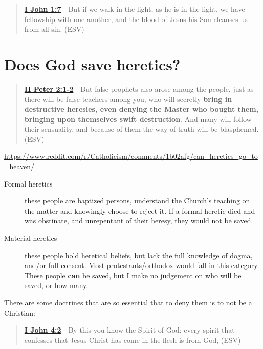 \documentclass[11pt]{article}
\begin{document}
\begin{quote}
\textbf{\href{https://www.biblegateway.com/passage/?search=1\%20John\%201\%3A7\&version=ESV}{I John 1:7}} - But if we walk in the light, as he is in the light, we have fellowship with one another, and the blood of Jesus his Son cleanses us from all sin. (ESV)
\end{quote}

\section{Does God save heretics?}
\label{sec:org36acc91}
\begin{quote}
\textbf{\href{https://www.biblegateway.com/passage/?search=2\%20Peter\%202\%3A1-2\&version=ESV}{II Peter 2:1-2}} - But false prophets also arose among the people, just as there will be false teachers among you, who will secretly \textbf{bring in destructive heresies, even denying the Master who bought them, bringing upon themselves swift destruction}. And many will follow their sensuality, and because of them the way of truth will be blasphemed. (ESV)
\end{quote}

\url{https://www.reddit.com/r/Catholicism/comments/1b02afg/can\_heretics\_go\_to\_heaven/}

\begin{description}
\item[{Formal heretics}] these people are baptized persons, understand the Church's teaching on the matter and knowingly choose to reject it. If a formal heretic died and was obstinate, and unrepentant of their heresy, they would not be saved.

\item[{Material heretics}] these people hold heretical beliefs, but lack the full knowledge of dogma, and/or full consent. Most protestants/orthodox would fall in this category. These people \textbf{can} be saved, but I make no judgement on who will be saved, or how many.
\end{description}

There are some doctrines that are so essential that to deny them is to not be a Christian:

\begin{quote}
\textbf{\href{https://www.biblegateway.com/passage/?search=1\%20John\%204\%3A2\&version=ESV}{I John 4:2}} - By this you know the Spirit of God: every spirit that confesses that Jesus Christ has come in the flesh is from God, (ESV)
\end{quote}
\end{document}
